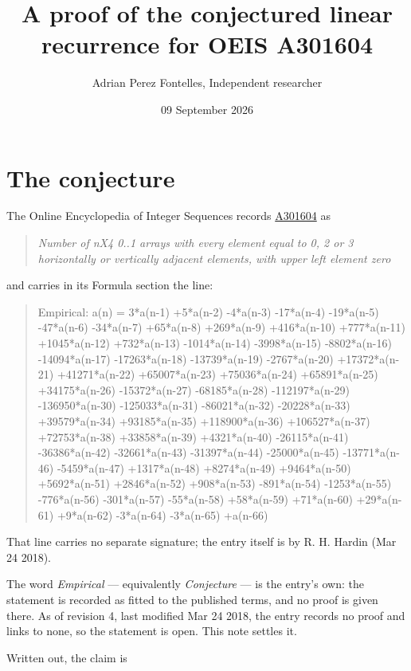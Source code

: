 \documentclass[11pt]{article}
\title{A proof of the conjectured linear recurrence for OEIS A301604}
\author{Adrian Perez Fontelles, Independent researcher}
\date{09 September 2026}
\theoremstyle{definition}
\begin{document}
\maketitle
\section{The conjecture}

The Online Encyclopedia of Integer Sequences records \href{https://oeis.org/A301604}{A301604} as

\begin{quote}\itshape Number of nX4 0..1 arrays with every element equal to 0, 2 or 3 horizontally or vertically adjacent elements, with upper left element zero\end{quote}

and carries in its Formula section the line:

\begin{quote}\ttfamily Empirical: a(n) = 3*a(n-1) +5*a(n-2) -4*a(n-3) -17*a(n-4) -19*a(n-5) -47*a(n-6) -34*a(n-7) +65*a(n-8) +269*a(n-9) +416*a(n-10) +777*a(n-11) +1045*a(n-12) +732*a(n-13) -1014*a(n-14) -3998*a(n-15) -8802*a(n-16) -14094*a(n-17) -17263*a(n-18) -13739*a(n-19) -2767*a(n-20) +17372*a(n-21) +41271*a(n-22) +65007*a(n-23) +75036*a(n-24) +65891*a(n-25) +34175*a(n-26) -15372*a(n-27) -68185*a(n-28) -112197*a(n-29) -136950*a(n-30) -125033*a(n-31) -86021*a(n-32) -20228*a(n-33) +39579*a(n-34) +93185*a(n-35) +118900*a(n-36) +106527*a(n-37) +72753*a(n-38) +33858*a(n-39) +4321*a(n-40) -26115*a(n-41) -36386*a(n-42) -32661*a(n-43) -31397*a(n-44) -25000*a(n-45) -13771*a(n-46) -5459*a(n-47) +1317*a(n-48) +8274*a(n-49) +9464*a(n-50) +5692*a(n-51) +2846*a(n-52) +908*a(n-53) -891*a(n-54) -1253*a(n-55) -776*a(n-56) -301*a(n-57) -55*a(n-58) +58*a(n-59) +71*a(n-60) +29*a(n-61) +9*a(n-62) -3*a(n-64) -3*a(n-65) +a(n-66)\end{quote}

That line carries no separate signature; the entry itself is by R. H. Hardin (Mar 24 2018).

The word {\itshape Empirical} --- equivalently {\itshape Conjecture} --- is the entry's own: the statement is recorded as fitted to the published terms, and no proof is given there. As of revision 4, last modified Mar 24 2018, the entry records no proof and links to none, so the statement is open. This note settles it.

Written out, the claim is
\end{document}
